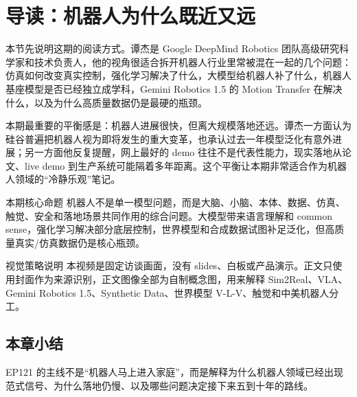 \section{导读：机器人为什么既近又远}

本节先说明这期的阅读方式。谭杰是 Google DeepMind Robotics 团队高级研究科学家和技术负责人，他的视角很适合拆开机器人行业里常被混在一起的几个问题：仿真如何改变真实控制，强化学习解决了什么，大模型给机器人补了什么，机器人基座模型是否已经独立成学科，Gemini Robotics 1.5 的 Motion Transfer 在解决什么，以及为什么高质量数据仍是最硬的瓶颈。

本期最重要的平衡感是：机器人进展很快，但离大规模落地还远。谭杰一方面认为硅谷普遍把机器人视为即将发生的重大变革，也承认过去一年模型泛化有意外进展；另一方面他反复提醒，网上最好的 demo 往往不是代表性能力，现实落地从论文、live demo 到生产系统可能隔着多年距离。这个平衡让本期非常适合作为机器人领域的“冷静乐观”笔记。

\begin{importantbox}{本期核心命题}
机器人不是单一模型问题，而是大脑、小脑、本体、数据、仿真、触觉、安全和落地场景共同作用的综合问题。大模型带来语言理解和 common sense，强化学习解决部分底层控制，世界模型和合成数据试图补足泛化，但高质量真实/仿真数据仍是核心瓶颈。
\end{importantbox}

\begin{knowledgebox}{视觉策略说明}
本视频是固定访谈画面，没有 slides、白板或产品演示。正文只使用封面作为来源识别，正文图像全部为自制概念图，用来解释 Sim2Real、VLA、Gemini Robotics 1.5、Synthetic Data、世界模型 V-L-V、触觉和中美机器人分工。
\end{knowledgebox}

\subsection{本章小结}

EP121 的主线不是“机器人马上进入家庭”，而是解释为什么机器人领域已经出现范式信号、为什么落地仍慢、以及哪些问题决定接下来五到十年的路线。

